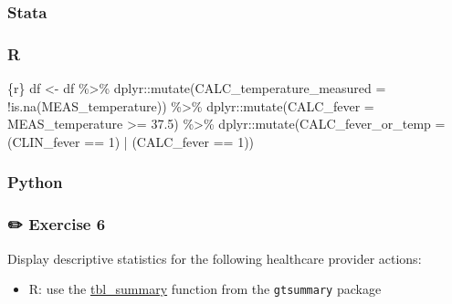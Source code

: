 \documentclass[
  letterpaper,
  DIV=11,
  numbers=noendperiod,
  oneside]{scrreprt}
\newenvironment{Shaded}{\begin{snugshade}}{\end{snugshade}}
\newcommand{\AttributeTok}[1]{\textcolor[rgb]{0.40,0.45,0.13}{#1}}
\newcommand{\DecValTok}[1]{\textcolor[rgb]{0.68,0.00,0.00}{#1}}
\newcommand{\FloatTok}[1]{\textcolor[rgb]{0.68,0.00,0.00}{#1}}
\newcommand{\FunctionTok}[1]{\textcolor[rgb]{0.28,0.35,0.67}{#1}}
\newcommand{\InformationTok}[1]{\textcolor[rgb]{0.37,0.37,0.37}{#1}}
\newcommand{\NormalTok}[1]{\textcolor[rgb]{0.00,0.23,0.31}{#1}}
\newcommand{\OtherTok}[1]{\textcolor[rgb]{0.00,0.23,0.31}{#1}}
\newcommand{\SpecialCharTok}[1]{\textcolor[rgb]{0.37,0.37,0.37}{#1}}
\providecommand{\tightlist}{%
  \setlength{\itemsep}{0pt}\setlength{\parskip}{0pt}}\usepackage{longtable,booktabs,array}
\begin{document}
\subsubsection{Stata}

\subsubsection{R}

\begin{Shaded}
\begin{Highlighting}[]
\InformationTok{\textasciigrave{}\textasciigrave{}\textasciigrave{}\{r\}}
\NormalTok{df }\OtherTok{\textless{}{-}}\NormalTok{ df }\SpecialCharTok{\%\textgreater{}\%}
\NormalTok{  dplyr}\SpecialCharTok{::}\FunctionTok{mutate}\NormalTok{(}\AttributeTok{CALC\_temperature\_measured =} \SpecialCharTok{!}\FunctionTok{is.na}\NormalTok{(MEAS\_temperature)) }\SpecialCharTok{\%\textgreater{}\%}
\NormalTok{  dplyr}\SpecialCharTok{::}\FunctionTok{mutate}\NormalTok{(}\AttributeTok{CALC\_fever =}\NormalTok{ MEAS\_temperature }\SpecialCharTok{\textgreater{}=} \FloatTok{37.5}\NormalTok{) }\SpecialCharTok{\%\textgreater{}\%}
\NormalTok{  dplyr}\SpecialCharTok{::}\FunctionTok{mutate}\NormalTok{(}\AttributeTok{CALC\_fever\_or\_temp =}\NormalTok{ (CLIN\_fever }\SpecialCharTok{==} \DecValTok{1}\NormalTok{) }\SpecialCharTok{|}\NormalTok{ (CALC\_fever }\SpecialCharTok{==} \DecValTok{1}\NormalTok{))}
\InformationTok{\textasciigrave{}\textasciigrave{}\textasciigrave{}}
\end{Highlighting}
\end{Shaded}

\subsubsection{Python}

\subsubsection{\texorpdfstring{{✏️} Exercise 6}{✏️ Exercise 6}}

Display descriptive statistics for the following healthcare provider
actions:

\begin{tcolorbox}[enhanced jigsaw, coltitle=black, opacityback=0, title=\textcolor{quarto-callout-tip-color}{\faLightbulb}\hspace{0.5em}{Tip}, toprule=.15mm, bottomtitle=1mm, colbacktitle=quarto-callout-tip-color!10!white, colframe=quarto-callout-tip-color-frame, left=2mm, opacitybacktitle=0.6, bottomrule=.15mm, arc=.35mm, toptitle=1mm, colback=white, titlerule=0mm, breakable, leftrule=.75mm, rightrule=.15mm]

\begin{itemize}
\tightlist
\item
  R: use the
  \href{https://www.danieldsjoberg.com/gtsummary/reference/tbl_summary.html}{tbl\_summary}
  function from the \texttt{gtsummary} package
\end{itemize}

\end{tcolorbox}
\end{document}

